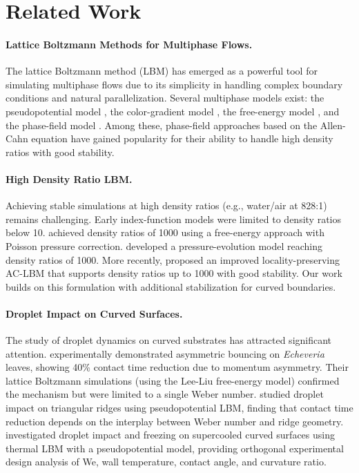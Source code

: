 \section{Related Work}\label{sec:related}

\paragraph{Lattice Boltzmann Methods for Multiphase Flows.}
The lattice Boltzmann method (LBM) has emerged as a powerful tool for simulating multiphase flows due to its simplicity in handling complex boundary conditions and natural parallelization. Several multiphase models exist: the pseudopotential model \citep{shan1993lattice}, the color-gradient model \citep{gunstensen1991lattice}, the free-energy model \citep{swift1995lattice}, and the phase-field model \citep{lee2005lattice}. Among these, phase-field approaches based on the Allen-Cahn equation \citep{fakhari2017improved} have gained popularity for their ability to handle high density ratios with good stability.

\paragraph{High Density Ratio LBM.}
Achieving stable simulations at high density ratios (e.g., water/air at 828:1) remains challenging. Early index-function models were limited to density ratios below 10. \citet{inamuro2004lattice} achieved density ratios of 1000 using a free-energy approach with Poisson pressure correction. \citet{lee2005pressure} developed a pressure-evolution model reaching density ratios of 1000. More recently, \citet{fakhari2017improved} proposed an improved locality-preserving AC-LBM that supports density ratios up to 1000 with good stability. Our work builds on this formulation with additional stabilization for curved boundaries.

\paragraph{Droplet Impact on Curved Surfaces.}
The study of droplet dynamics on curved substrates has attracted significant attention. \citet{liu2015symmetry} experimentally demonstrated asymmetric bouncing on \emph{Echeveria} leaves, showing 40\% contact time reduction due to momentum asymmetry. Their lattice Boltzmann simulations (using the Lee-Liu free-energy model) confirmed the mechanism but were limited to a single Weber number. \citet{xu2022droplet} studied droplet impact on triangular ridges using pseudopotential LBM, finding that contact time reduction depends on the interplay between Weber number and ridge geometry. \citet{xiao2025numerical} investigated droplet impact and freezing on supercooled curved surfaces using thermal LBM with a pseudopotential model, providing orthogonal experimental design analysis of We, wall temperature, contact angle, and curvature ratio.

